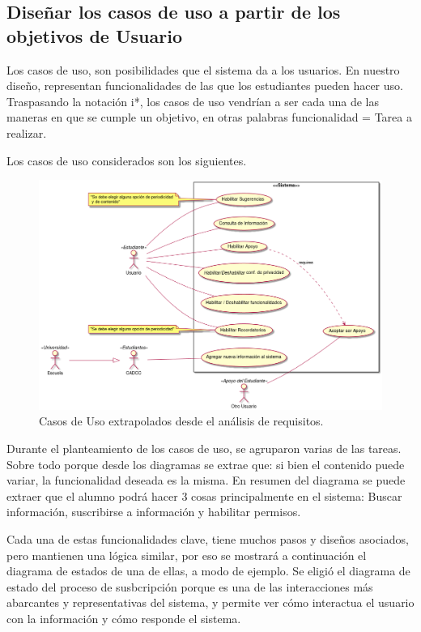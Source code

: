     \subsection{Diseñar los casos de uso a partir de los objetivos de Usuario}
    \par Los casos de uso, son posibilidades que el sistema da a los usuarios. En nuestro diseño, representan funcionalidades de las que los estudiantes pueden hacer uso. Traspasando la notación \gls{i*}, los casos de uso vendrían a ser cada una de las maneras en que se cumple un objetivo, en otras palabras funcionalidad = Tarea a realizar.
    \par Los casos de uso considerados son los siguientes.

        \begin{figure}[h]
            \centering
            \includegraphics[width=\textwidth]{media/diagramas/casos_de_uso/Diagrama-CU.png}
            \caption[Casos de Uso]{Casos de Uso extrapolados desde el análisis de requisitos.}
            \label{}
        \end{figure}

    \par Durante el planteamiento de los casos de uso, se agruparon varias de las tareas. Sobre todo porque desde los diagramas se extrae que: si bien el contenido puede variar, la funcionalidad deseada es la misma.
    En resumen del diagrama se puede extraer que el alumno podrá hacer 3 cosas principalmente en el sistema: Buscar información, suscribirse a información y habilitar permisos.
    \par Cada una de estas funcionalidades clave, tiene muchos pasos y diseños asociados, pero mantienen una lógica similar, por eso se mostrará a continuación el diagrama de estados de una de ellas, a modo de ejemplo. Se eligió el diagrama de estado del proceso de susbcripción porque es una de las interacciones más abarcantes y representativas del sistema, y permite ver cómo interactua el usuario con
    la información y cómo responde el sistema.
    
